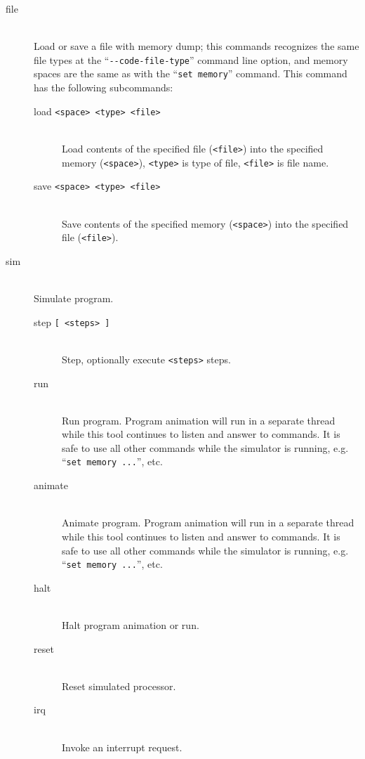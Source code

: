 \begin{description}
            \item[file]~\\
                Load or save a file with memory dump; this commands recognizes the same file types at the ``\texttt{-{}-code-file-type}'' command line option, and memory spaces are the same as with the ``\texttt{set~memory}'' command.
                This command has the following subcommands:
                \begin{description}
                    \item[load \texttt{<space> <type> <file>}]~\\
                        Load contents of the specified file (\texttt{<file>}) into the specified memory (\texttt{<space>}), \texttt{<type>} is type of file, \texttt{<file>} is file name.
                    \item[save \texttt{<space> <type> <file>}]~\\
                        Save contents of the specified memory (\texttt{<space>}) into the specified file (\texttt{<file>}).
                \end{description}

            \item[sim]~\\
                Simulate program.
                \begin{description}
                    \item[step \texttt{{[} <steps> {]}}]~\\
                        Step, optionally execute \texttt{<steps>} steps.
                    \item[run]~\\
                        Run program. Program animation will run in a separate thread while this tool continues to listen and answer to commands. It is safe to use all other commands while the simulator is running, e.g. ``\texttt{set~memory~...}'', etc.
                    \item[animate]~\\
                        Animate program. Program animation will run in a separate thread while this tool continues to listen and answer to commands. It is safe to use all other commands while the simulator is running, e.g. ``\texttt{set~memory~...}'', etc.
                    \item[halt]~\\
                        Halt program animation or run.
                    \item[reset]~\\
                        Reset simulated processor.
                    \item[irq]~\\
                        Invoke an interrupt request.
                \end{description}


\end{description}
